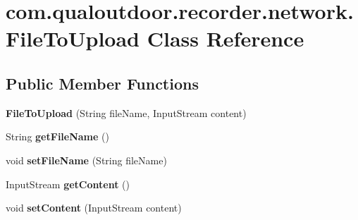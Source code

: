 \hypertarget{classcom_1_1qualoutdoor_1_1recorder_1_1network_1_1FileToUpload}{\section{com.\-qualoutdoor.\-recorder.\-network.\-File\-To\-Upload Class Reference}
\label{classcom_1_1qualoutdoor_1_1recorder_1_1network_1_1FileToUpload}
}
\subsection*{Public Member Functions}
\begin{DoxyCompactItemize}
\item 
\hypertarget{classcom_1_1qualoutdoor_1_1recorder_1_1network_1_1FileToUpload_ab31f8d9fe40f9c7ed00299bdab866e23}{{\bfseries File\-To\-Upload} (String file\-Name, Input\-Stream content)}\label{classcom_1_1qualoutdoor_1_1recorder_1_1network_1_1FileToUpload_ab31f8d9fe40f9c7ed00299bdab866e23}

\item 
\hypertarget{classcom_1_1qualoutdoor_1_1recorder_1_1network_1_1FileToUpload_a15699757be49837291a47aec4bc18782}{String {\bfseries get\-File\-Name} ()}\label{classcom_1_1qualoutdoor_1_1recorder_1_1network_1_1FileToUpload_a15699757be49837291a47aec4bc18782}

\item 
\hypertarget{classcom_1_1qualoutdoor_1_1recorder_1_1network_1_1FileToUpload_aca5f7083002ec7cee65dea965abf0110}{void {\bfseries set\-File\-Name} (String file\-Name)}\label{classcom_1_1qualoutdoor_1_1recorder_1_1network_1_1FileToUpload_aca5f7083002ec7cee65dea965abf0110}

\item 
\hypertarget{classcom_1_1qualoutdoor_1_1recorder_1_1network_1_1FileToUpload_aabd0433a2a37b280bfdafae9ab6e75e9}{Input\-Stream {\bfseries get\-Content} ()}\label{classcom_1_1qualoutdoor_1_1recorder_1_1network_1_1FileToUpload_aabd0433a2a37b280bfdafae9ab6e75e9}

\item 
\hypertarget{classcom_1_1qualoutdoor_1_1recorder_1_1network_1_1FileToUpload_a50660ee9a827a5a3e1903c8d3ce9c584}{void {\bfseries set\-Content} (Input\-Stream content)}\label{classcom_1_1qualoutdoor_1_1recorder_1_1network_1_1FileToUpload_a50660ee9a827a5a3e1903c8d3ce9c584}

\end{DoxyCompactItemize}

